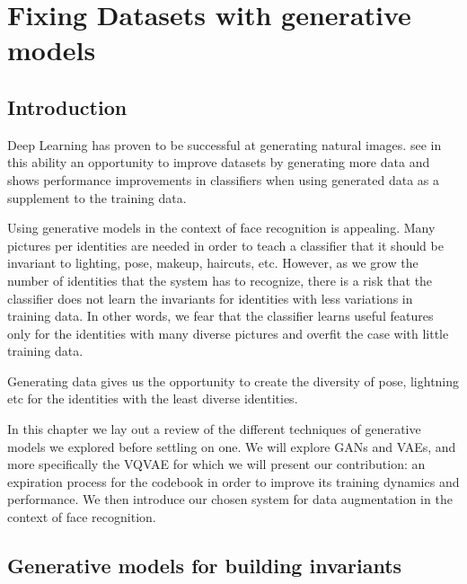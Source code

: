 \chapter{Fixing Datasets with generative models}
\label{chap:gan}

\newcommand{\pdata}[0]{\p_\texttt{data}}
\newcommand{\pfake}[0]{\p_\texttt{fake}}
\newcommand{\ppath}[0]{\p_\texttt{path}}
\newcommand{\pz}[0]{\p_z(z)}

\section{Introduction}

Deep Learning has proven to be successful at generating natural images. \citet{dagan} see in this ability an opportunity to improve datasets by generating more data and shows performance improvements in classifiers when using generated data as a supplement to the training data.

Using generative models in the context of face recognition is appealing. Many pictures per identities are needed in order to teach a classifier that it should be invariant to lighting, pose, makeup, haircuts, etc. However, as we grow the number of identities that the system has to recognize, there is a risk that the classifier does not learn the invariants for identities with less variations in training data. In other words, we fear that the classifier learns useful features only for the identities with many diverse pictures and overfit the case with little training data.

Generating data gives us the opportunity to create the diversity of pose, lightning etc for the identities with the least diverse identities.

In this chapter we lay out a review of the different techniques of generative models we explored before settling on one. We will explore \acp{GAN} and \acp{VAE}, and more specifically the \ac{VQVAE} for which we will present our contribution: an expiration process for the codebook in order to improve its training dynamics and performance. We then introduce our chosen system for data augmentation in the context of face recognition.

\section{Generative models for building invariants}

